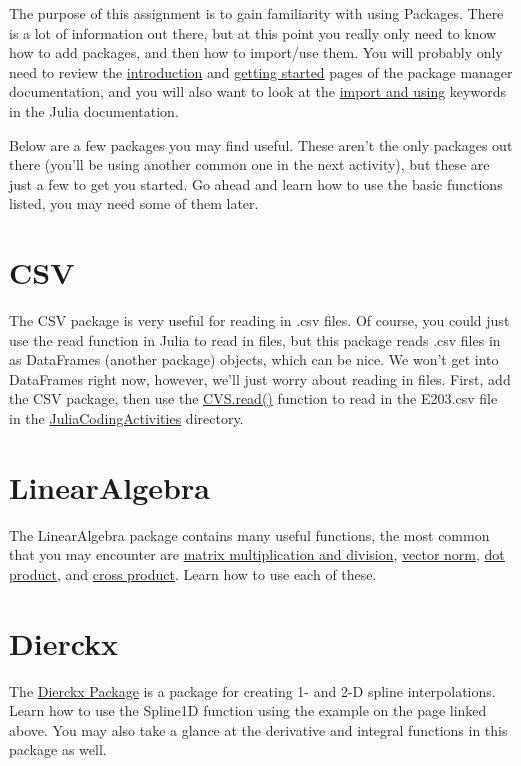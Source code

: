 \documentclass{article}%
\begin{document}
The purpose of this assignment is to gain familiarity with using Packages. There is a lot of information out there, but at this point you really only need to know how to add packages, and then how to import/use them. You will probably only need to review the \href{https://julialang.github.io/Pkg.jl/v1/}{introduction} and \href{https://julialang.github.io/Pkg.jl/v1/getting-started/}{getting started} pages of the package manager documentation, and you will also want to look at the \href{https://docs.julialang.org/en/v1/base/base/#import}{import and using} keywords in the Julia documentation.

Below are a few packages you may find useful. These aren't the only packages out there (you'll be using another common one in the next activity), but these are just a few to get you started. Go ahead and learn how to use the basic functions listed, you may need some of them later.

\section*{CSV}

The CSV package is very useful for reading in .csv files. Of course, you could just use the read function in Julia to read in files, but this package reads .csv files in as DataFrames (another package) objects, which can be nice. We won't get into DataFrames right now, however, we'll just worry about reading in files. First, add the CSV package, then use the \href{http://juliadata.github.io/CSV.jl/v0.1.1/index.html#CSV.read}{CVS.read()} function to read in the E203.csv file in the \href{https://github.com/byuflowlab/undergrad-onboarding/tree/master/1-activities/JuliaCodingActivities}{JuliaCodingActivities} directory.

\section*{LinearAlgebra}

The LinearAlgebra package contains many useful functions, the most common that you may encounter are \href{https://docs.julialang.org/en/v1/stdlib/LinearAlgebra/index.html#Standard-Functions-1}{matrix multiplication and division}, \href{https://docs.julialang.org/en/v1/stdlib/LinearAlgebra/index.html#LinearAlgebra.dot}{vector norm}, \href{https://docs.julialang.org/en/v1/stdlib/LinearAlgebra/index.html#LinearAlgebra.dot}{dot product}, and \href{https://docs.julialang.org/en/v1/stdlib/LinearAlgebra/index.html#LinearAlgebra.cross}{cross product}. Learn how to use each of these.

\section*{Dierckx}

The \href{https://github.com/kbarbary/Dierckx.jl}{Dierckx Package} is a package for creating 1- and 2-D spline interpolations. Learn how to use the Spline1D function using the example on the page linked above. You may also take a glance at the derivative and integral functions in this package as well.
\end{document}
